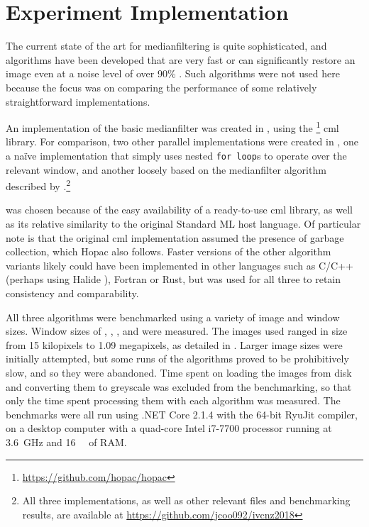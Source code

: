 \section{ Experiment Implementation}

The current state of the art for \gls{medianfilter}ing is quite sophisticated, and algorithms have been developed that are very fast \cite{Sanchez2012,Perrot2014} or can significantly restore an image even at a noise level of over 90\% \cite{Gao2015,Wu2011}.  Such algorithms were not used here because the focus was on comparing the performance of some relatively straightforward implementations.

An implementation of the basic \gls{medianfilter} was created in \fsharp{}, using the \hopac{}\footnote{\url{https://github.com/hopac/hopac}} \gls{cml} library.  For comparison, two other parallel implementations were created in \fsharp{}, one a naïve implementation that simply uses nested \texttt{for loop}s to operate over the relevant window, and another loosely based on the \gls{medianfilter} algorithm described by \citeauthor{Braunl2001} \cite{Braunl2001}.\footnote{All three implementations, as well as other relevant files and benchmarking results, are available at \url{https://github.com/jcoo092/ivcnz2018}}

\fsharp{} was chosen because of the easy availability of a ready-to-use \gls{cml} library, as well as its relative similarity to the original Standard ML host language.  Of particular note is that the original \gls{cml} implementation assumed the presence of garbage collection, which Hopac also follows.  Faster versions of the other algorithm variants likely could have been implemented in other languages such as C/C++ (perhaps using Halide \cite{Ragan-Kelley2017}), Fortran or Rust, but \fsharp{} was used for all three to retain consistency and comparability.  

All three algorithms were benchmarked using a variety of image and window sizes.  Window sizes of , , ,  and  were measured.  The images used ranged in size from 15 kilopixels to 1.09 megapixels, as detailed in .  Larger image sizes were initially attempted, but some runs of the algorithms proved to be prohibitively slow, and so they were abandoned.  Time spent on loading the images from disk and converting them to greyscale was excluded from the benchmarking, so that only the time spent processing them with each algorithm was measured.  The benchmarks were all run using .NET Core 2.1.4 with the 64-bit RyuJit compiler, on a desktop computer with a quad-core Intel i7-7700 processor running at \qty{3.6}{\giga\hertz} and \qty{16}{\giga\byte} of RAM.

